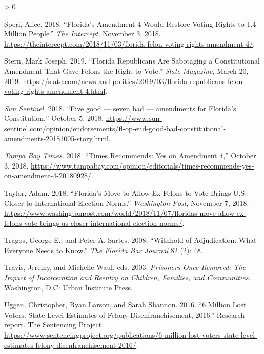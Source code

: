 \documentclass[
  12pt,
]{article}
\newlength{\cslhangindent}
\newenvironment{CSLReferences}[2] %
 {%
  \setlength{\parindent}{0pt}
  \ifodd #1 \everypar{\setlength{\hangindent}{\cslhangindent}}\ignorespaces\fi
  \ifnum #2 > 0
  \setlength{\parskip}{#2\baselineskip}
  \fi
 }%
 {}
\begin{document}
\begin{CSLReferences}{1}{0}
\leavevmode\hypertarget{ref-Speri2018}{}%
Speri, Alice. 2018. {``Florida's {Amendment} 4 {Would Restore Voting Rights} to 1.4 {Million People}.''} \emph{The Intercept}, November 3, 2018. \url{https://theintercept.com/2018/11/03/florida-felon-voting-rights-amendment-4/}.

\leavevmode\hypertarget{ref-Stern2019}{}%
Stern, Mark Joseph. 2019. {``Florida {Republicans Are Sabotaging} a {Constitutional Amendment That Gave Felons} the {Right} to {Vote}.''} \emph{Slate Magazine}, March 20, 2019. \url{https://slate.com/news-and-politics/2019/03/florida-republicans-felon-voting-rights-amendment-4.html}.

\leavevmode\hypertarget{ref-SunSentinelEditorial2018}{}%
\emph{Sun Sentinel}. 2018. {``Five good --- seven bad --- amendments for Florida's Constitution,''} October 5, 2018. \url{https://www.sun-sentinel.com/opinion/endorsements/fl-op-end-good-bad-constitutional-amendments-20181005-story.html}.

\leavevmode\hypertarget{ref-tampabaytimes2018}{}%
\emph{Tampa Bay Times}. 2018. {``Times Recommends: {Yes} on {Amendment} 4,''} October 3, 2018. \url{https://www.tampabay.com/opinion/editorials/times-recommends-yes-on-amendment-4-20180928/}.

\leavevmode\hypertarget{ref-Taylor2018}{}%
Taylor, Adam. 2018. {``Florida's Move to Allow Ex-Felons to Vote Brings {U}.{S}. Closer to International Election Norms.''} \emph{Washington Post}, November 7, 2018. \url{https://www.washingtonpost.com/world/2018/11/07/floridas-move-allow-ex-felons-vote-brings-us-closer-international-election-norms/}.

\leavevmode\hypertarget{ref-Tragos2008}{}%
Tragos, George E., and Peter A. Sartes. 2008. {``Withhold of {Adjudication}: {What Everyone Needs} to {Know}.''} \emph{The Florida Bar Journal} 82 (2): 48.

\leavevmode\hypertarget{ref-Travis2003}{}%
Travis, Jeremy, and Michelle Waul, eds. 2003. \emph{Prisoners Once Removed: The Impact of Incarceration and Reentry on Children, Families, and Communities}. {Washington, D.C}: {Urban Institute Press}.

\leavevmode\hypertarget{ref-sentencing_2016}{}%
Uggen, Christopher, Ryan Larson, and Sarah Shannon. 2016. {``6 {Million Lost Voters}: {State}-{Level Estimates} of {Felony Disenfranchisement}, 2016.''} Research report. {The Sentencing Project}. \url{https://www.sentencingproject.org/publications/6-million-lost-voters-state-level-estimates-felony-disenfranchisement-2016/}.


\end{CSLReferences}
\end{document}
